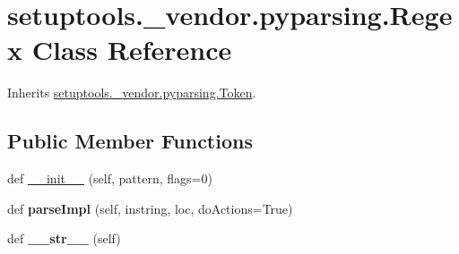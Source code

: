 \hypertarget{classsetuptools_1_1__vendor_1_1pyparsing_1_1_regex}{}\section{setuptools.\+\_\+vendor.\+pyparsing.\+Regex Class Reference}
\label{classsetuptools_1_1__vendor_1_1pyparsing_1_1_regex}


Inherits \hyperlink{classsetuptools_1_1__vendor_1_1pyparsing_1_1_token}{setuptools.\+\_\+vendor.\+pyparsing.\+Token}.

\subsection*{Public Member Functions}
\begin{DoxyCompactItemize}
\item 
def \hyperlink{classsetuptools_1_1__vendor_1_1pyparsing_1_1_regex_a2bf2a91eb8c1faa95c32ec015dfe6a2a}{\+\_\+\+\_\+init\+\_\+\+\_\+} (self, pattern, flags=0)
\item 
\mbox{\label{classsetuptools_1_1__vendor_1_1pyparsing_1_1_regex_a718eded9f697312aab4748ee7dddcd39}} 
def {\bfseries parse\+Impl} (self, instring, loc, do\+Actions=True)
\item 
\mbox{\label{classsetuptools_1_1__vendor_1_1pyparsing_1_1_regex_a2c416a74248d2cf168b3914bd15658e0}} 
def {\bfseries \+\_\+\+\_\+str\+\_\+\+\_\+} (self)
\end{DoxyCompactItemize}
